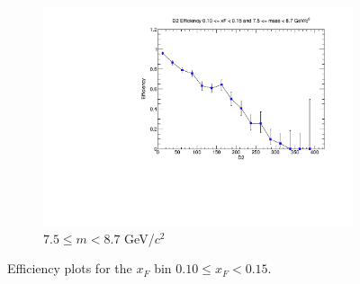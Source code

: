 \documentclass[11pt]{article}
\begin{document}
\begin{figure}[p]
\begin{subfigure}[b]{0.32\textwidth}
        \includegraphics[width=\textwidth]{./kTrackerEfficiencyPlots/D2_Efficiency_xF2_mass10.pdf}
        \caption{$7.5 \leq m < 8.7$ GeV/$c^2$}
    \end{subfigure}
    \caption{Efficiency plots for the $x_F$ bin $0.10 \leq x_F < 0.15$.}
\end{figure}
\end{document}
